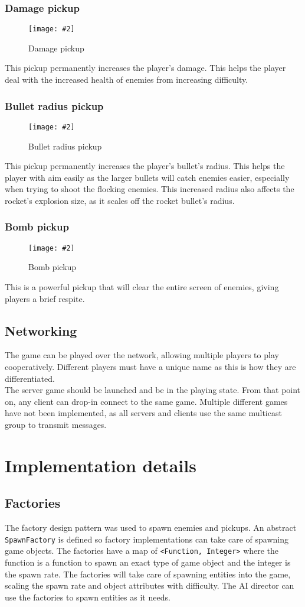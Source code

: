 \documentclass{article}
\newcommand{\n}[0]{\\[\baselineskip]}
\newcommand{\figimg}[3]{
  \begin{figure}[H]
    \centering
    \texttt{[image: \#2]}
    \caption{#3}
  \end{figure}
  \noindent 
}
\begin{document}
\subsubsection{Damage pickup}
\figimg{0.1}{imgs/DamagePickup.png}{Damage pickup}
This pickup permanently increases the player's damage. This helps the player deal with the increased health of enemies from increasing difficulty.

\subsubsection{Bullet radius pickup}
\figimg{0.1}{imgs/RadiusPickup.png}{Bullet radius pickup}
This pickup permanently increases the player's bullet's radius. This helps the player with aim easily as the larger bullets will catch enemies easier, especially when trying to shoot the flocking enemies. This increased radius also affects the rocket's explosion size, as it scales off the rocket bullet's radius.

\subsubsection{Bomb pickup}
\figimg{0.1}{imgs/BombPickup.png}{Bomb pickup}
This is a powerful pickup that will clear the entire screen of enemies, giving players a brief respite. 

\subsection{Networking}
The game can be played over the network, allowing multiple players to play cooperatively. Different players must have a unique name as this is how they are differentiated. 
\n
The server game should be launched and be in the playing state. From that point on, any client can drop-in connect to the same game. Multiple different games have not been implemented, as all servers and clients use the same multicast group to transmit messages.

\section{Implementation details}
\subsection{Factories}
The factory design pattern was used to spawn enemies and pickups. An abstract \texttt{SpawnFactory} is defined so factory implementations can take care of spawning game objects. The factories have a map of \texttt{<Function, Integer>} where the function is a function to spawn an exact type of game object and the integer is the spawn rate. The factories will take care of spawning entities into the game, scaling the spawn rate and object attributes with difficulty. The AI director can use the factories to spawn entities as it needs.
\end{document}
